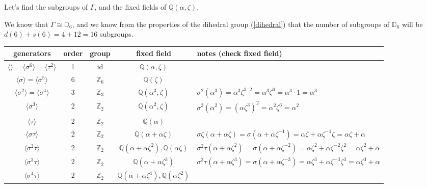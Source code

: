 \documentclass{article}
\theoremstyle{definition}
\begin{document}
\vspace{0.5cm}

Let's find the subgroups of $\Gamma$, and the fixed fields of $\mathbb{Q}(\alpha, \zeta)$.

We know that $\Gamma \cong \mathbb{D}_6$, and we know from the properties
of the dihedral group (\ref{dihedral}) that the number of subgroups of
$\mathbb{D}_6$ will be $d(6) + s(6) = 4 + 12 = 16$ subgroups.


\vspace{0.4cm}

\hspace*{-3.5cm}
\begin{tabular}{ c c c c | p{7.5cm} }
  \hline
  generators & order & group & fixed field & notes (check fixed field)\\
\hline
  $\langle \rangle = \langle \sigma^6 \rangle=\langle \tau^2 \rangle$ & 1 & id & $\mathbb{Q}(\alpha,\zeta)$ & \\
  $\langle \sigma \rangle = \langle \sigma^5 \rangle$ & 6 & $\mathbb{Z}_6$ & $\mathbb{Q}(\zeta)$ & \\
  $\langle \sigma^2 \rangle=\langle \sigma^4 \rangle$ & 3 & $\mathbb{Z}_3$ & $\mathbb{Q}(\alpha^3, \zeta)$ & $\sigma^2(\alpha^3)=\alpha^3 \zeta^{3\cdot 2}=\alpha^3 \zeta^6 = \alpha^3 \cdot 1 = \alpha^3$\\
  $\langle \sigma^3 \rangle$ & 2 & $\mathbb{Z}_2$ & $\mathbb{Q}(\alpha^2,\zeta)$ & $\sigma^3(\alpha^2)=(\alpha\zeta^3)^2=\alpha^2\zeta^6=\alpha^2$\\
  \hline
  $\langle \tau \rangle$ & 2 & $\mathbb{Z}_2$ & $\mathbb{Q}(\alpha)$ & \\
  \hline
  $\langle \sigma\tau \rangle$ & 2 & $\mathbb{Z}_2$ & $\mathbb{Q}(\alpha+\alpha\zeta)$ &
      $\sigma\zeta(\alpha+\alpha\zeta)=\sigma(\alpha+\alpha\zeta^{-1}) = \alpha\zeta + \alpha\zeta^{-1}\zeta=\alpha\zeta+\alpha$\\
  $\langle \sigma^2\tau \rangle$ & 2 & $\mathbb{Z}_2$ & $\mathbb{Q}(\alpha+\alpha\zeta^2), \mathbb{Q}(\alpha\zeta)$ &
      $\sigma^2\tau(\alpha+\alpha\zeta^2) = \sigma(\alpha+\alpha\zeta^{-2})=\alpha\zeta^2+ \alpha\zeta^{-2}\zeta^2=\alpha\zeta^2+\alpha$\\
  $\langle \sigma^3\tau \rangle$ & 2 & $\mathbb{Z}_2$ & $\mathbb{Q}(\alpha+\alpha\zeta^3)$ &
      $\sigma^3\tau(\alpha+\alpha\zeta^3) = \sigma(\alpha+\alpha\zeta^{-3})=\alpha\zeta^3+ \alpha\zeta^{-3}\zeta^3=\alpha\zeta^3+\alpha$\\
  $\langle \sigma^4\tau \rangle$ & 2 & $\mathbb{Z}_2$ & $\mathbb{Q}(\alpha+\alpha\zeta^4), \mathbb{Q}(\alpha\zeta^2)$ &

\end{tabular}
\end{document}
